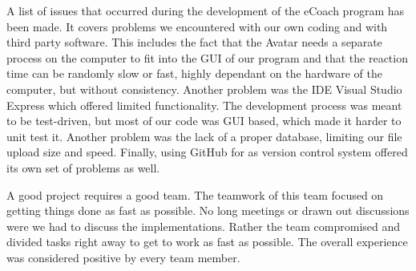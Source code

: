 A list of issues that occurred during the development of the eCoach program has been made. It covers problems we encountered with our own coding and with third party software. This includes the fact that the Avatar needs a separate process on the computer to fit into the GUI of our program and that the reaction time can be randomly slow or fast, highly dependant on the hardware of the computer, but without consistency. Another problem was the IDE Visual Studio Express which offered limited functionality. 
The development process was meant to be test-driven, but most of our code was GUI based, which made it harder to unit test it. Another problem was the lack of a proper database, limiting our file upload size and speed. Finally, using GitHub for as version control system offered its own set of problems as well.

A good project requires a good team. The teamwork of this team focused on getting things done as fast as possible. No long meetings or drawn out discussions were we had to discuss the implementations. Rather the team compromised and divided tasks right away to get to work as fast as possible. The overall experience was considered positive by every team member.
